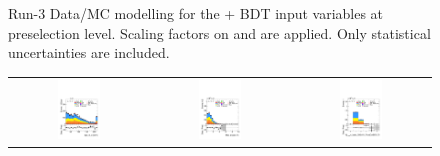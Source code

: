 \begin{figure}[htbp]
  \caption{Run-3 Data/MC modelling for the \thqb + \ttH BDT input variables at preselection level. Scaling factors on \ztautau and \ttbar are applied. Only statistical uncertainties are included.}
  \label{tth_vars_modelling_run3_2}
\end{figure}

\begin{figure}[htbp]
  \centering
  \setlength{\tabcolsep}{1.5pt}
  \renewcommand{\arraystretch}{1.0}

  \begin{tabular}{@{}c c c@{}}
    \includegraphics[width=0.33\textwidth]{images/plots_modelling_run2_run3_variables/run_3_tth/plot_bjet_0_pt_hh_tth_22_23_24.pdf} &
    \includegraphics[width=0.33\textwidth]{images/plots_modelling_run2_run3_variables/run_3_tth/plot_dEta_bH_max_hh_tth_22_23_24.pdf} &
    \includegraphics[width=0.33\textwidth]{images/plots_modelling_run2_run3_variables/run_3_tth/plot_n_bjets_GN2v01_FixedCutBEff_70_hh_tth_22_23_24.pdf}

\end{tabular}
\end{figure}
